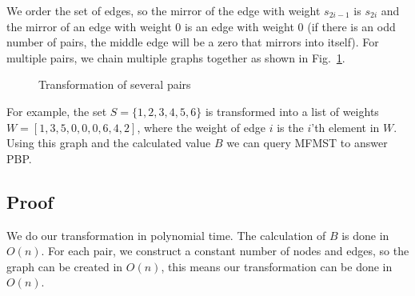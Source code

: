 \documentclass[11pt,a4paper]{article}
\begin{document}
We order the set of edges, so the mirror of the edge with weight $s_{2i-1}$ is $s_{2i}$ and the mirror of an edge with weight 0 is an edge with weight 0 (if there is an odd number of pairs, the middle edge will be a zero that mirrors into itself). For multiple pairs, we chain multiple graphs together as shown in Fig.~\ref{fig:transform2}. 
\begin{figure}[htb]
\caption{Transformation of several pairs}
\label{fig:transform2}
\end{figure}

For example, the set $S=\lbrace 1,2,3,4,5,6 \rbrace$ is transformed into a list of weights $W=[1,3,5,0,0,0,6,4,2]$, where the weight of edge $i$ is the $i$'th element in $W$.
\noindent
Using this graph and the calculated value $B$ we can query MFMST to answer PBP.

\subsection{Proof}

We do our transformation in polynomial time. The calculation of $B$ is done in $O(n)$. For each pair, we construct a constant number of nodes and edges, so the graph can be created in $O(n)$, this means our transformation can be done in $O(n)$.
\end{document}
